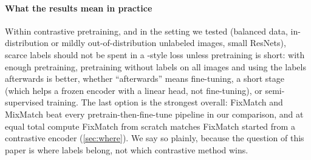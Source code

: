 \paragraph{What the results mean in practice}
Within contrastive pretraining, and in the setting we tested (balanced data, in-distribution or mildly
out-of-distribution unlabeled images, small ResNets), scarce labels should not be spent in a \supcon-style
loss unless pretraining is short: with enough pretraining, pretraining without labels on all images and using the
labels afterwards is better, whether
``afterwards'' means fine-tuning, a short \supcon stage (which helps a frozen encoder with a linear head, not
fine-tuning), or semi-supervised training. The last option is
the strongest overall: FixMatch and MixMatch \citep{sohn2020fixmatch,berthelot2019mixmatch} beat every
pretrain-then-fine-tune pipeline in our comparison, and at equal total compute FixMatch from scratch matches
FixMatch started from a contrastive encoder (\cref{sec:where}). We say so plainly,
because the question of this paper is where labels belong, not which contrastive method wins.
